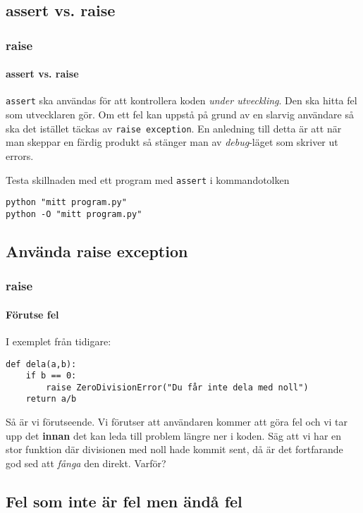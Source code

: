 \documentclass[aspectratio=169]{beamer}
\begin{document}
\subsection{assert vs. raise}

\begin{frame}[fragile]
	\frametitle{raise}
	\framesubtitle{assert vs. raise}
	
	\texttt{assert} ska användas för att kontrollera koden \textit{under utveckling}. Den ska hitta fel som utvecklaren gör. Om ett fel kan uppstå på grund av en slarvig användare så ska det istället täckas av \texttt{raise exception}. En anledning till detta är att när man skeppar en färdig produkt så stänger man av \textit{debug}-läget som skriver ut errors.
	
	Testa skillnaden med ett program med \texttt{assert} i kommandotolken
	
	\begin{lstlisting}
python "mitt program.py"
python -O "mitt program.py"
	\end{lstlisting}
	
\end{frame}

\subsection{Använda raise exception}

\begin{frame}[fragile]
	\frametitle{raise}
	\framesubtitle{Förutse fel}
	
	I exemplet från tidigare:
	
	\begin{lstlisting}
def dela(a,b):
    if b == 0:
        raise ZeroDivisionError("Du får inte dela med noll")
    return a/b
    \end{lstlisting}
    
    Så är vi förutseende. Vi förutser att användaren kommer att göra fel och vi tar upp det \textbf{innan} det kan leda till problem längre ner i koden. Säg att vi har en stor funktion där divisionen med noll hade kommit sent, då är det fortfarande god sed att \textit{fånga} den direkt. Varför?
	
\end{frame}

\subsection{Fel som inte är fel men ändå fel}
\end{document}
